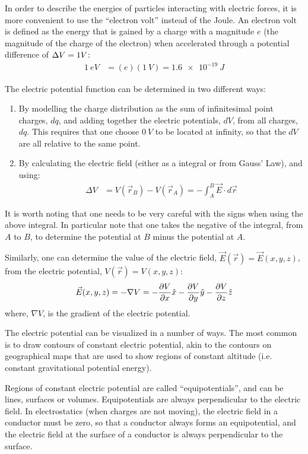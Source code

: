 \begin{chapterSummary}
In order to describe the energies of particles interacting with electric forces, it is more convenient to use the ``electron volt'' instead of the Joule. An electron volt is defined as the energy that is gained by a charge with a magnitude $e$ (the magnitude of the charge of the electron) when accelerated through a potential difference of $\Delta V=\SI1{}{V}$:
\begin{align*}
\SI{1}{eV}&=(e)(\SI{1}{V})=\SI{1.6e-19}{J}
\end{align*}

The electric potential function can be determined in two different ways:
\begin{enumerate}
\item By modelling the charge distribution as the sum of infinitesimal point charges, $dq$, and adding together the electric potentials, $dV$, from all charges, $dq$. This requires that one choose $\SI{0}{V}$ to be located at infinity, so that the $dV$ are all relative to the same point.
\item By calculating the electric field (either as a integral or from Gauss' Law), and using:
\begin{align*}
\Delta V &=V(\vec r_B)-V(\vec r_A)=-\int_A^B  \vec E\cdot d\vec r
\end{align*}
\end{enumerate}
It is worth noting that one needs to be very careful with the signs when using the above integral. In particular note that one takes the negative of the integral, from $A$ to $B$, to determine the potential at $B$ minus the potential at $A$. 

Similarly, one can determine the value of the electric field, $\vec E(\vec r)=\vec E(x,y,z)$, from the electric potential, $V(\vec r)=V(x,y,z)$:
\begin{align*}
\vec E(x,y,z) = -\nabla V =-\frac{\partial V}{\partial x}\hat x-\frac{\partial V}{\partial y}\hat y-\frac{\partial V}{\partial z}\hat z
\end{align*}
where, $\nabla V$, is the gradient of the electric potential. 

The electric potential can be visualized in a number of ways. The most common is to draw contours of constant electric potential, akin to the contours on geographical maps that are used to show regions of constant altitude (i.e. constant gravitational potential energy).

Regions of constant electric potential are called ``equipotentials'', and can be lines, surfaces or volumes. Equipotentials are always perpendicular to the electric field. In electrostatics (when charges are not moving), the electric field in a conductor must be zero, so that a conductor always forms an equipotential, and the electric field at the surface of a conductor is always perpendicular to the surface.


\end{chapterSummary}
